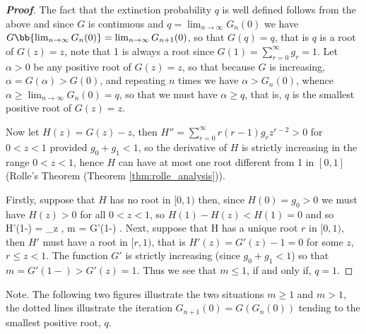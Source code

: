 \begin{proof}[\bf Proof]
The fact that the extinction probability $q$ is well defined follows from the above and since $G$ is continuous and $q = \lim_{n\to \infty}G_n(0)$ we have $G\bb{\lim_{n\to\infty} G_n(0)} = \lim_{n\to\infty}G_{n+1}(0)$, so that $G(q) = q$, that is $q$ is a root of $G(z) = z$, note that 1 is always a root since
$G(1) = \sum^\infty_{r=0} g_r = 1$. Let $\alpha > 0$ be any positive root of $G(z) = z$, so that because $G$ is increasing, $\alpha = G(\alpha) > G(0)$, and repeating $n$ times we have $\alpha > G_n(0)$, whence $\alpha \geq \lim_{n\to\infty} G_n(0) = q$, so that we must have $\alpha\geq q$, that is, $q$ is the smallest positive root of $G(z) = z$.

Now let $H(z) = G(z)-z$, then $H'' = \sum^\infty_{r=0} r(r-1)g_rz^{r-2} > 0$ for $0 < z < 1$ provided $g_0 + g_1 < 1$, so the derivative of $H$ is strictly increasing in the range $0 < z < 1$, hence $H$ can have at most one root different from 1 in $[0, 1]$ (Rolle's Theorem (Theorem \ref{thm:rolle_analysis})).

Firstly, suppose that $H$ has no root in $[0, 1)$ then, since $H(0) = g_0 > 0$ we must have $H(z) > 0$ for all $0 < z < 1$, so $H(1) - H(z) < H(1) = 0$ and so
\be
H'(1-) = \lim_{z}  ,\quad\quad {} m = G'(1-) .
\ee
Next, suppose that H has a unique root $r$ in $[0, 1)$, then $H'$ must have a root in $[r, 1)$, that is $H'(z) = G'(z)-1 = 0$ for some $z$, $r \leq z < 1$. The function $G'$ is strictly increasing (since $g_0 + g_1 < 1$) so that $m = G'(1-) > G'(z) = 1$. Thus we see that $m \leq 1$, if and only if, $q = 1$.
\end{proof}


Note. The following two figures illustrate the two situations $m \geq 1$ and $m > 1$, the dotted lines illustrate the iteration $G_{n+1}(0) = G(G_n(0))$ tending to the smallest positive root, $q$.

